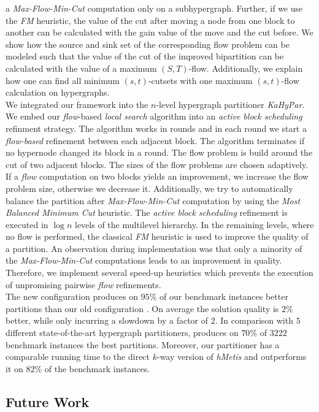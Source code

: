 a \emph{Max-Flow-Min-Cut} computation only on a subhypergraph. 
Further, if we use the \emph{FM} heuristic, the value of the cut after moving a node from one 
block to another can be calculated with the gain value of the move and the cut before.
We show how the source and sink set of the corresponding flow problem can be modeled such 
that the value of the cut of the improved bipartition can be calculated with the value 
of a maximum $(S,T)$-flow. Additionally, we explain how one can find all 
minimum $(s,t)$-cutsets with one maximum $(s,t)$-flow calculation on hypergraphs. \\
We integrated our framework into the $n$-level hypergraph partitioner
\emph{KaHyPar}. We embed our \emph{flow}-based \emph{local search} algorithm into 
an \emph{active block scheduling} refinment strategy. The algorithm works in rounds and in
each round we start a \emph{flow-based} refinement between each adjacent block. The
algorithm terminates if no hypernode changed its block in a round. The flow problem
is build around the cut of two adjacent blocks.
The sizes of the flow problems are chosen adaptively. If a \emph{flow} computation on two blocks
yields an improvement, we increase the flow problem size, otherwise we decrease it. 
Additionally, we try to automatically balance the partition after \emph{Max-Flow-Min-Cut}
computation by using the \emph{Most Balanced Minimum Cut} heuristic. The \emph{active block
scheduling} refinement is executed in $\log{n}$ levels of the multilevel hierarchy.
In the remaining levels, where no flow is performed, 
the classical \emph{FM} heuristic is used to improve the quality 
of a partition. An observation during implementation was that only a minority of 
the \emph{Max-Flow-Min-Cut} computations leads to an improvement in quality. 
Therefore, we implement several speed-up heuristics which prevents the
execution of unpromising pairwise \emph{flow} refinements. \\
The new configuration  produces on $95\%$ of our benchmark instances
better partitions than our old configuration . On average the solution 
quality is $2\%$ better, while only incurring a slowdown by a factor of $2$. 
In comparison with $5$ different state-of-the-art hypergraph partitioners,  
produces on $70\%$ of $3222$ benchmark instances the best partitions. 
Moreover, our partitioner has a comparable running time to the direct $k$-way
version of \emph{hMetis} and outperforms it on $82\%$ of the benchmark instances.


\subsection{Future Work}

